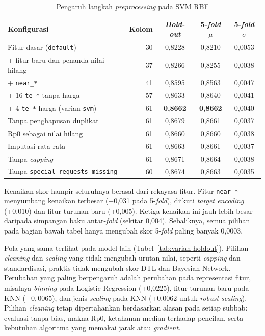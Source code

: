 \begin{table}[H]
	\centering
	\caption{Pengaruh langkah \textit{preprocessing} pada SVM RBF}
	\label{tab:ablasi}
	\small
	\begin{tabular}{l r c c c}
		\toprule
		\textbf{Konfigurasi} & \textbf{Kolom} & \textbf{\textit{Hold-out}} & \textbf{5-\textit{fold} $\mu$} & \textbf{5-\textit{fold} $\sigma$} \\
		\midrule
		Fitur dasar (\texttt{default})                 & 30 & 0,8228 & 0,8210 & 0,0053 \\
		+ fitur baru dan penanda nilai hilang          & 37 & 0,8266 & 0,8255 & 0,0038 \\
		+ \texttt{near\_*}                             & 41 & 0,8595 & 0,8563 & 0,0047 \\
		+ 16 \texttt{te\_*} tanpa harga                & 57 & 0,8633 & 0,8640 & 0,0041 \\
		+ 4 \texttt{te\_*} harga (varian \texttt{svm}) & 61 & \textbf{0,8662} & \textbf{0,8662} & 0,0040 \\
		\midrule
		Tanpa penghapusan duplikat                     & 61 & 0,8679 & 0,8661 & 0,0037 \\
		Rp0 sebagai nilai hilang                       & 61 & 0,8660 & 0,8660 & 0,0038 \\
		Imputasi rata-rata                             & 61 & 0,8663 & 0,8661 & 0,0037 \\
		Tanpa \textit{capping}                         & 61 & 0,8671 & 0,8664 & 0,0038 \\
		Tanpa \texttt{special\_requests\_missing}      & 60 & 0,8674 & 0,8663 & 0,0035 \\
		\bottomrule
	\end{tabular}
\end{table}

Kenaikan skor hampir seluruhnya berasal dari rekayasa fitur. Fitur
\texttt{near\_*} menyumbang kenaikan terbesar (+0,031 pada 5-\textit{fold}),
diikuti \textit{target encoding} (+0,010) dan fitur turunan baru (+0,005). Ketiga
kenaikan ini jauh lebih besar daripada simpangan baku antar-\textit{fold}
(sekitar 0,004). Sebaliknya, semua pilihan pada bagian bawah tabel hanya mengubah
skor 5-\textit{fold} paling banyak 0,0003.

Pola yang sama terlihat pada model lain (Tabel~\ref{tab:varian-holdout}).
Pilihan \textit{cleaning} dan \textit{scaling} yang tidak mengubah urutan nilai,
seperti \textit{capping} dan standardisasi, praktis tidak mengubah skor DTL dan
Bayesian Network. Perubahan yang paling berpengaruh adalah perubahan pada
representasi fitur, misalnya \textit{binning} pada Logistic Regression (+0,0225),
fitur turunan baru pada KNN ($-0{,}0065$), dan jenis \textit{scaling} pada KNN
(+0,0062 untuk \textit{robust scaling}). Pilihan
\textit{cleaning} tetap dipertahankan berdasarkan alasan pada setiap subbab:
evaluasi tanpa bias, makna Rp0, ketahanan median terhadap pencilan, serta
kebutuhan algoritma yang memakai jarak atau \textit{gradient}.

